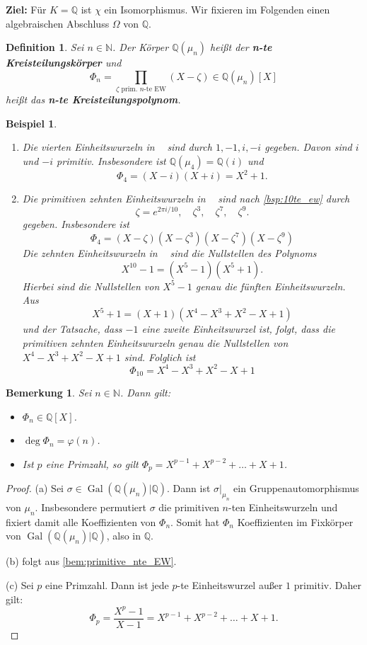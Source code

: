 \documentclass[a4paper, twoside, 11pt, ngerman]{report}
\newcommand{\NN}{\mathds N}
\newcommand{\QQ}{\mathds Q}
\DeclareMathOperator{\alg}{alg}
\DeclareMathOperator{\Gal}{Gal}
\DeclareMathOperator{\QQalg}{\QQ^{\alg}}
\theoremstyle{definistyle}
\newtheorem{defini}[satz]{Definition}
\newtheorem{bem}[satz]{Bemerkung}
\newtheorem{bsp}[satz]{Beispiel}
\theoremstyle{remark}
\newcommand{\defn}[1]{\textit{\bfseries #1}}
\begin{document}
\textbf{Ziel:} Für $K = \QQ$ ist $\chi$ ein Isomorphismus. Wir fixieren im Folgenden einen
algebraischen Abschluss $\Omega$ von $\QQ$.


\begin{defini}\label{def:kreisteilungspolynom}
Sei $n \in \NN$. Der Körper $\QQ(\mu_n)$ heißt der \defn{n-te Kreisteilungskörper} und
\[
\Phi_n = \prod_{\zeta \text{ prim. } n\text{-te EW}} (X - \zeta) \in \QQ(\mu_n)[X]
\]
heißt das \defn{n-te Kreisteilungspolynom}.
\end{defini}

\begin{bsp}\label{bsp:kreisteilungspolynom_phi4}
\begin{enumerate}
\item[(a)] Die vierten Einheitswurzeln in $\QQalg$ sind durch $1,-1,i,-i$ gegeben. Davon sind $i$ und $-i$ primitiv.
Insbesondere ist $\QQ(\mu_4)=\QQ(i)$ und 
\[
\Phi_4 = (X - i)(X + i) = X^2 + 1.
\]
\item[(b)] Die primitiven zehnten Einheitswurzeln in $\QQalg$ sind nach \ref{bsp:10te_ew}
durch 
\[
\zeta = e^{2\pi i / 10}, \quad \zeta^3, \quad \zeta^7, \quad \zeta^9.
\]
gegeben. Insbesondere ist 
\[
\Phi_4=(X-\zeta)(X-\zeta^3)(X-\zeta^7)(X-\zeta^9)
\]
Die zehnten Einheitswurzeln in $\QQalg$ sind die Nullstellen des Polynoms
\[
X^{10}-1=(X^5-1)(X^5+1).
\]
Hierbei sind die Nullstellen von $X^5-1$ genau die fünften Einheitswurzeln.
Aus
\[
X^5+1=(X+1)(X^4-X^3+X^2-X+1)
\]
und der Tatsache, dass $-1$ eine zweite Einheitswurzel ist, folgt, dass die primitiven zehnten Einheitswurzeln genau die Nullstellen von $X^4-X^3+X^2-X+1$ sind.
Folglich ist
\[
\Phi_{10}=X^4-X^3+X^2-X+1
\]
\end{enumerate}
\end{bsp}

\begin{bem}\label{bem:eig_kreisteilungspolynom}
Sei $n \in \NN$. Dann gilt:
\begin{itemize}
    \item[(a)] $\Phi_n \in \QQ[X]$.
    \item[(b)] $\deg \Phi_n = \varphi(n)$.
    \item[(c)] Ist $p$ eine Primzahl, so gilt $\Phi_p = X^{p-1} + X^{p-2} + \dots + X + 1$.
\end{itemize}
\end{bem}

\begin{proof}
(a) Sei $\sigma \in \Gal(\QQ(\mu_n) | \QQ)$. Dann ist $\sigma|_{\mu_n}$ ein Gruppenautomorphismus von $\mu_n$. Insbesondere permutiert $\sigma$ die primitiven $n$-ten Einheitswurzeln und fixiert damit alle Koeffizienten von $\Phi_n$. 
Somit hat $\Phi_n$ Koeffizienten im Fixkörper von $\Gal(\QQ(\mu_n)|\QQ)$, also in $\QQ$. 

(b) folgt aus \ref{bem:primitive_nte_EW}.

(c) Sei $p$ eine Primzahl. Dann ist jede $p$-te Einheitswurzel außer $1$ primitiv. Daher gilt:
\[
\Phi_p = \frac{X^p - 1}{X - 1}=X^{p-1} + X^{p-2} + \dots + X + 1.
\]
\end{proof}
\end{document}
